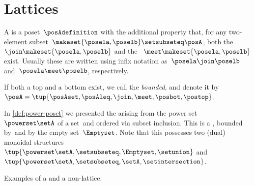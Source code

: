 
\section{Lattices}


\begin{definition}[Lattice]
    \label{def:lattice}
    A  is a poset~$\posAdefinition$ with the additional property that, for any two-element subset~$\makeset{\posela, \poselb} \setsubseteq \posA$, both the ~$\join \makeset{\posela, \poselb}$ and the ~$\meet \makeset{\posela, \poselb }$ exist.
    Usually these are written using infix notation as~$\posela \join \poselb$ and~$\posela \meet \poselb$, respectively.
\end{definition}

\begin{marginfigure}
    \centering
    \caption{}
    \label{fig:lattice-wood}
\end{marginfigure}

\begin{definition}
    \label{def:bounded-lattice}
    If both a top and a bottom exist, we call the  \emph{bounded}, and denote it
    by~$\posA = \tup{\posAset,\posAleq,\join,\meet,\posbot,\postop}$.
\end{definition}

\begin{example}
    In \cref{def:power-poset} we presented the  arising from the power set~$\powerset \setA$ of a set~\setA and ordered via subset inclusion.
    This is a , bounded by~\setA and by the empty set~$\Emptyset$.
    Note that this  possesses two (dual) monoidal structures~$\tup{\powerset \setA,\setsubseteq,\Emptyset,{{\setunion}}}$ and~$\tup{\powerset \setA,\setsubseteq,\setA,{{\setintersection}}}$.
\end{example}

\begin{marginfigure}
    \centering

    \caption{Examples of a  and a non-lattice. }
    \label{fig:exlattice}
\end{marginfigure}

